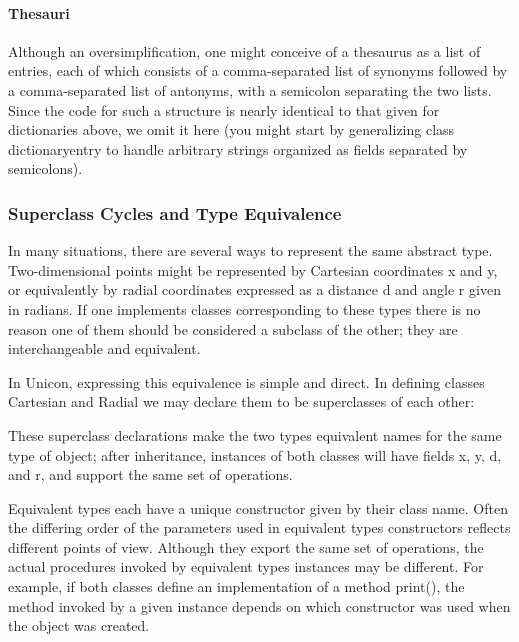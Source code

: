 \paragraph{Thesauri}
Although an oversimplification, one might conceive of a thesaurus as a
list of entries, each of which consists of a comma-separated list of
synonyms followed by a comma-separated list of antonyms, with a
semicolon separating the two lists. Since the code for such a structure
is nearly identical to that given for dictionaries above, we omit it
here (you might start by generalizing class \textsf{dictionaryentry} to
handle arbitrary strings organized as fields separated by semicolons). 

\subsubsection{Superclass Cycles and Type Equivalence}
In many situations, there are several ways to represent the same
abstract type. Two-dimensional points might be represented by
Cartesian coordinates x and y, or
equivalently by radial coordinates expressed as a distance d and angle
r given in radians. If one implements classes
corresponding to these types there is no reason one of them should be
considered a subclass of the other; they are interchangeable and
equivalent. 

In Unicon, expressing this equivalence is simple and direct. In defining
classes \textsf{Cartesian} and \textsf{Radial} we may declare them to
be superclasses of each other: 


These superclass declarations make the two types equivalent names for
the same type of object; after inheritance,
instances of both classes will
have fields x, y, d, and r, and support the same set of operations. 

Equivalent types each have a unique constructor
given by their class name. Often the differing order of the parameters
used in equivalent types{\textquotesingle} constructors reflects
different points of view. Although they export the same set of
operations, the actual procedures invoked by equivalent
types{\textquotesingle} instances may be different. For example, if
both classes define an implementation of a method \textsf{print()}, the
method invoked by a given instance depends on which constructor was
used when the object was created.

